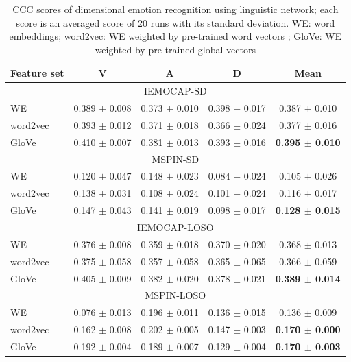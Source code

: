 \begin{table}[htpb]
\caption{CCC scores of dimensional emotion recognition using linguistic
network; each score is an averaged score of 20 runs with its standard
deviation. WE: word embeddings; word2vec: WE weighted by pre-trained word
vectors \cite{Mikolov}; GloVe: WE weighted by pre-trained global vectors
\cite{Pennington2014}}
\begin{center}
 \label{tab:ter-test}
 \begin{tabular}{l c c c c}
 \hline
Feature set & V & A & D & Mean \\
\hline \hline
\multicolumn{5}{c}{IEMOCAP-SD} \\
WE          & 0.389 $\pm$ 0.008 & 0.373 $\pm$ 0.010 & 0.398 $\pm$ 0.017 &
0.387 $\pm$ 0.010 \\
word2vec    & 0.393 $\pm$ 0.012 & 0.371 $\pm$ 0.018 & 0.366 $\pm$ 0.024 &
0.377 $\pm$ 0.016 \\
GloVe       & 0.410 $\pm$ 0.007 & 0.381 $\pm$ 0.013 & 0.393 $\pm$ 0.016 &
\textbf{0.395 $\pm$ 0.010} \\

 \hline
\multicolumn{5}{c}{MSPIN-SD} \\
WE          & 0.120 $\pm$ 0.047 &   0.148 $\pm$ 0.023   & 0.084 $\pm$ 0.024 &
0.105 $\pm$ 0.026 \\
word2vec    & 0.138 $\pm$ 0.031 &   0.108 $\pm$ 0.024   & 0.101 $\pm$ 0.024 &
0.116 $\pm$ 0.017 \\
GloVe       & 0.147 $\pm$ 0.043 &   0.141 $\pm$ 0.019   & 0.098 $\pm$ 0.017 &
\textbf{0.128 $\pm$ 0.015} \\
 \hline
\multicolumn{5}{c}{IEMOCAP-LOSO} \\
WE          & 0.376 $\pm$ 0.008 &   0.359 $\pm$ 0.018 & 0.370 $\pm$ 0.020 &
0.368 $\pm$ 0.013 \\
word2vec    & 0.375 $\pm$ 0.058 &   0.357 $\pm$ 0.058 & 0.365 $\pm$ 0.065 &
0.366 $\pm$ 0.059 \\
GloVe       & 0.405 $\pm$ 0.009 &   0.382 $\pm$ 0.020 & 0.378 $\pm$ 0.021 &
\textbf{0.389 $\pm$ 0.014} \\
 \hline
\multicolumn{5}{c}{MSPIN-LOSO} \\
WE          & 0.076 $\pm$ 0.013 &   0.196 $\pm$ 0.011 & 0.136 $\pm$ 0.015 &
0.136 $\pm$ 0.009 \\
word2vec    & 0.162 $\pm$ 0.008 &   0.202 $\pm$ 0.005 & 0.147 $\pm$ 0.003 &
\textbf{0.170 $\pm$ 0.000} \\
GloVe       & 0.192 $\pm$ 0.004 &   0.189 $\pm$ 0.007 & 0.129 $\pm$ 0.004 &
\textbf{0.170 $\pm$ 0.003} \\
 \hline
 \end{tabular}
\end{center}
\end{table} 

